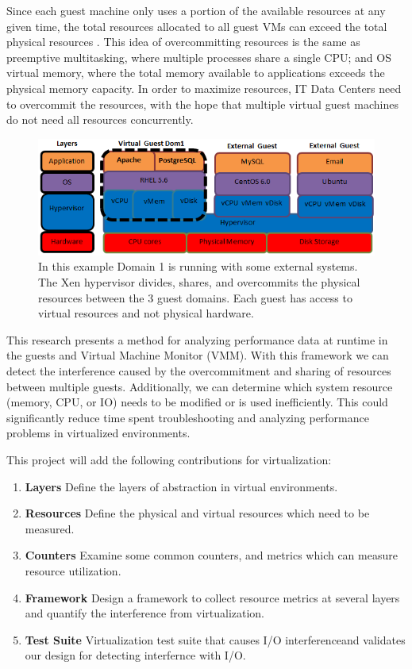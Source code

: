 \indent Since each guest machine only uses a portion of the available resources at any given time, the total resources allocated to all guest VMs can exceed the total physical resources \cite{huber2, amit, buell1}.   This idea of overcommitting resources is the same as preemptive multitasking, where multiple processes share a single CPU; and OS virtual memory, where the total memory available to applications exceeds the physical memory capacity.  In order to maximize resources, IT Data Centers need to overcommit the resources, with the hope that multiple virtual guest machines do not need all resources concurrently.  

\begin{figure}[!h]
  \begin{center}
  \includegraphics[width=6in]{images/LayersAll.png}
  \caption{In this example Domain 1 is running with some external systems.  The Xen hypervisor  divides, shares, and overcommits the physical resources between the 3 guest domains.  Each guest has access to virtual resources and not physical hardware.}
  \label{virtStack}
  \end{center}
\end{figure}

\indent This research presents a method for analyzing performance data at runtime in the guests and Virtual Machine Monitor (VMM).   With this framework we can detect the interference caused by the overcommitment and sharing of resources between multiple guests.  Additionally, we can determine which system resource (memory, CPU, or IO) needs to be modified or is used inefficiently.  This could significantly reduce time spent troubleshooting and analyzing performance problems in virtualized environments.

\indent This project will add the following contributions for virtualization:
\begin{enumerate}
\item \textbf{Layers} Define the layers of abstraction in virtual environments.
\item \textbf{Resources} Define the physical and virtual resources which need to be measured.
\item \textbf{Counters} Examine some common counters, and metrics which can measure resource utilization.
\item \textbf{Framework} Design a framework to collect resource metrics at several layers and quantify the interference from virtualization.
\item \textbf{Test Suite} Virtualization test suite that causes I/O interferenceand validates our design for detecting interfernce with I/O.
\end{enumerate}

